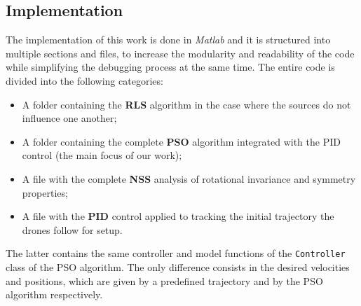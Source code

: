 \documentclass[main]{subfiles}
\begin{document}
\subsection{Implementation}
The implementation of this work is done in \textit{Matlab} and it
is structured into multiple sections and files, to increase the modularity and 
readability of the code while simplifying the debugging process at the same time. 
The entire code is divided into the following categories:
\begin{itemize}
    \item A folder containing the \textbf{RLS} algorithm in the case where the sources
 do not influence one another;
    \item A folder containing the complete \textbf{PSO} algorithm integrated with 
 the PID control (the main focus of our work);
    \item A file with the complete \textbf{NSS} analysis of rotational invariance
 and symmetry properties;
    \item A file with the \textbf{PID} control applied to tracking the initial trajectory
 the drones follow for setup.
\end{itemize}
The latter contains the same controller and model functions of the \texttt{Controller}
class of the PSO algorithm. The only difference consists in the desired velocities and positions, 
which are given by a predefined trajectory and by the PSO algorithm
respectively.
\end{document}
